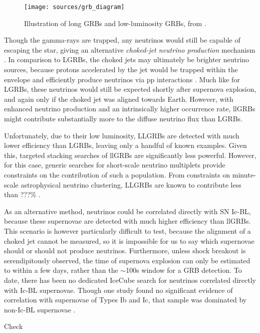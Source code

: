 \begin{figure}[!ht]
	\centering \texttt{[image: sources/grb\_diagram]}
	\caption{Illustration of long GRBs and low-luminosity GRBs, from \cite{nakar_15_llgrb}.}
	\label{fig:grb_diagram}
\end{figure}

Though the gamma-rays are trapped, any neutrinos would still be capable of escaping the star, giving an alternative \emph{choked-jet neutrino production} mechanism . In comparison to LGRBs, the choked jets may ultimately be brighter neutrino sources, because protons accelerated by the jet would be trapped within the envelope and efficiently produce neutrinos via pp interactions \cite{nakar_15_llgrb}. Much like for LGRBs, these neutrinos would still be expected shortly after supernova explosion, and again only if the choked jet was aligned towards Earth. However, with enhanced neutrino production and an intrinsically higher occurrence rate, llGRBs might contribute substantially more to the diffuse neutrino flux than LGRBs. 

Unfortunately, due to their low luminosity, LLGRBs are detected with much lower efficiency than LGRBs, leaving only a handful of known examples. Given this, targeted stacking searches of llGRBs are significantly less powerful. However, for this case, generic searches for short-scale neutrino multiplets provide constraints on the contribution of such a population. From constraints on minute-scale astrophysical neutrino clustering, LLGRBs are known to contribute less than ???\% .

As an alternative method, neutrinos could be correlated directly with SN Ic-BL, because these supernovae are detected with much higher efficiency than llGRBs. This scenario is however particularly difficult to test, because the alignment of a choked jet cannot be measured, so it is impossible for us to say which supernovae should or should not produce neutrinos. Furthermore, unless shock breakout is serendipitously observed, the time of supernova explosion can only be estimated to within a few days, rather than the $\sim$100s window for a GRB detection. To date, there has been no dedicated IceCube search for neutrinos correlated directly with Ic-BL supernovae. Though one study found no significant evidence of correlation with supernovae of Types Ib and Ic, that sample was dominated by non-Ic-BL supernovae \cite{Stasik2018Search}. 

Check

